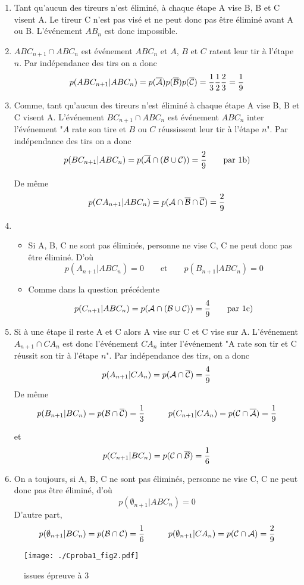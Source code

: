 \begin{enumerate}
\begin{enumerate}
\item Tant qu'aucun des tireurs n'est éliminé, à chaque étape A vise B,  B et C visent A. Le tireur C n'est pas visé et ne peut donc pas être éliminé avant A ou B. L'événement $AB_n$ est donc impossible.
\item $ABC_{n+1}\cap ABC_n$ est événement $ABC_n$ et \og$A$, $B$ et $C$ ratent leur tir à l'étape $n$\fg. Par indépendance des tirs on a donc 
$$p(ABC_{n+1}|ABC_n)=p (\overline{{\cal A}})p(\overline{{\cal B}})p(\overline{{\cal C}})=\frac 13\frac12\frac23=\frac19$$
\item Comme, tant qu'aucun des tireurs n'est éliminé à chaque étape A vise B,  B et C visent A. L'événement $BC_{n+1}\cap ABC_n$ est événement $ABC_n$ inter l'événement "$A$ rate son tire et  $B$ ou $C$ réussissent   leur tir à l'étape $n$". Par indépendance des tirs on a donc 
$$p(BC_{n+1}|ABC_n)=p (\overline{{\cal A}}\cap({\cal B}\cup {\cal C)})=\frac29 \qquad \text{par 1b)}$$

De même
 $$p(CA_{n+1}|ABC_n)=p ({{\cal A}}\cap\overline{{\cal B}}\cap\overline{ {\cal C}})=\frac 29$$
\item 
\begin{itemize}
\item Si A, B, C ne sont pas éliminés, personne ne vise C, C  ne peut donc pas  être éliminé. D'où
$$p(A_{n+1}|ABC_n)=0 \qquad \text{et}\qquad p(B_{n+1}|ABC_n)=0$$

\item  Comme dans la question précédente 
 $$p(C_{n+1}|ABC_n)= p({\cal A}\cap ({\cal B}\cup {\cal C)})=\frac 49 \qquad \text{par 1c)}$$
\end{itemize}
\item Si à une étape il reste A et C alors A vise sur C et C vise sur A. L'événement $A_{n+1}\cap CA_n$ est donc l'événement $CA_n$ inter l'événement "A rate son tir et C réussit son tir  à l'étape $n$". Par indépendance des tirs, on a donc 
$$p(A_{n+1}|CA_n)= p( {{\cal A}}\cap \overline{{\cal C}})=\frac 49 $$
De même
\begin{displaymath}
p(B_{n+1}|BC_n)= p({{\cal B}}\cap \overline{{\cal C}})=\frac 13\hspace{1cm}
 p(C_{n+1}|CA_{n})= p({{\cal C}}\cap \overline{{\cal A}})=\frac 19  
\end{displaymath}

 et $$p(C_{n+1}|BC_n)= p({{\cal C}}\cap \overline{{\cal B}})=\frac 16$$
\item On a toujours, si A, B, C ne sont pas éliminés, personne ne vise C, C  ne peut donc pas  être éliminé, d'où
$$p(\emptyset_{n+1}|ABC_n)=0$$
D'autre part,
\begin{displaymath}
p(\emptyset_{n+1}|BC_n)= p({{\cal B}}\cap {{\cal C}})=\frac 16
\hspace{1cm} 
p(\emptyset_{n+1}|CA_n)= p({{\cal C}}\cap {{\cal A}})=\frac 29
\end{displaymath}
\end{enumerate} 
\begin{figure}[h!]
  \centering
  \texttt{[image: ./Cproba1\_fig2.pdf]}
  \caption{issues épreuve à 3}
  \label{fig:Cproba1_fig2}
\end{figure}


\end{enumerate}
